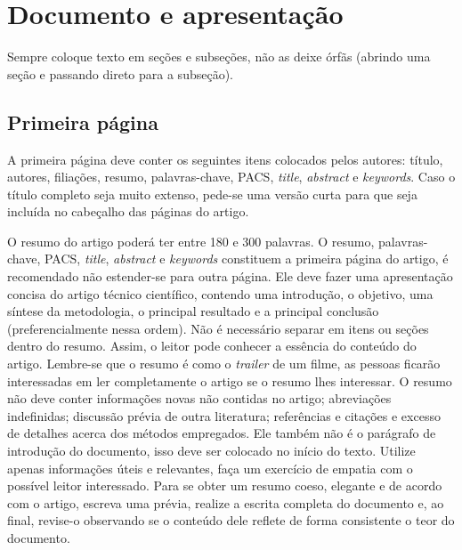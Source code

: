 \documentclass[12pt, a4paper, twoside, twocolumn]{article}
\begin{document}
\section{Documento e apresentação}

Sempre coloque texto em seções e subseções, não as deixe órfãs (abrindo uma seção e passando direto para a subseção).

\subsection{Primeira página}

A primeira página deve conter os seguintes itens colocados pelos autores: título, autores, filiações, resumo, palavras-chave, PACS, \textit{title}, \textit{abstract} e \textit{keywords}. 
%
Caso o título completo seja muito extenso, pede-se uma versão curta para que seja incluída no cabeçalho das páginas do artigo.


O resumo do artigo poderá ter entre 180 e 300 palavras. O resumo, palavras-chave, PACS, \textit{title}, \textit{abstract} e \textit{keywords} constituem a primeira página do artigo, é recomendado não estender-se para outra página. 
Ele deve fazer uma apresentação concisa do artigo técnico científico, contendo uma introdução, o objetivo, uma síntese da metodologia, o principal resultado e a principal conclusão (preferencialmente nessa ordem). Não é necessário separar em itens ou seções dentro do resumo. Assim, o leitor pode conhecer a essência do conteúdo do artigo. Lembre-se que o resumo é como o \textit{trailer} de um filme, as pessoas ficarão interessadas em ler completamente o artigo se o resumo lhes interessar. O resumo não deve conter informações novas não contidas no artigo; abreviações indefinidas; discussão prévia de outra literatura; referências e citações e excesso de detalhes acerca dos métodos empregados. Ele também não é o parágrafo de introdução do documento, isso deve ser colocado no início do texto. Utilize apenas informações úteis e relevantes, faça um exercício de empatia com o possível leitor interessado. Para se obter um resumo coeso, elegante e de acordo com o artigo, escreva uma prévia, realize a escrita completa do documento e, ao final, revise-o observando se o conteúdo dele reflete de forma consistente o teor do documento. 
\end{document}
